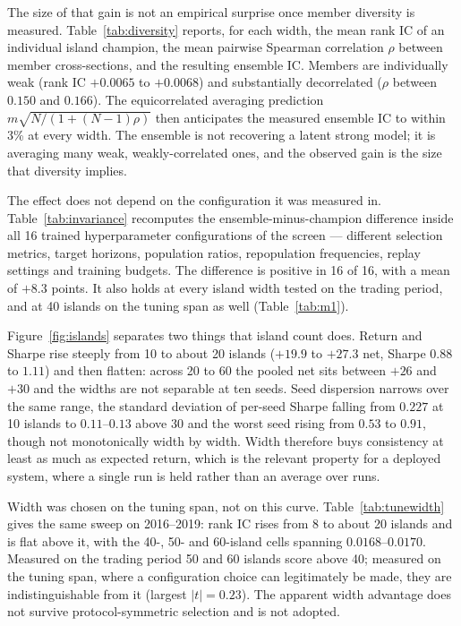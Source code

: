 
The size of that gain is not an empirical surprise once member diversity
is measured. Table~\ref{tab:diversity} reports, for each width, the mean
rank IC of an individual island champion, the mean pairwise Spearman
correlation $\rho$ between member cross-sections, and the resulting
ensemble IC. Members are individually weak (rank IC $+0.0065$ to
$+0.0068$) and substantially decorrelated ($\rho$ between $0.150$ and
$0.166$). The equicorrelated averaging prediction
$m\sqrt{N/(1+(N-1)\rho)}$ then anticipates the measured ensemble IC to
within 3\% at every width. The ensemble is not recovering a latent
strong model; it is averaging many weak, weakly-correlated ones, and the
observed gain is the size that diversity implies.


The effect does not depend on the configuration it was measured in.
Table~\ref{tab:invariance} recomputes the ensemble-minus-champion
difference inside all 16 trained hyperparameter configurations of the
screen --- different selection metrics, target horizons, population
ratios, repopulation frequencies, replay settings and training budgets.
The difference is positive in 16 of 16, with a mean of $+8.3$ points.
It also holds at every island width tested on the trading period, and at
40 islands on the tuning span as well (Table~\ref{tab:m1}).


Figure~\ref{fig:islands} separates two things that island count does.
Return and Sharpe rise steeply from 10 to about 20 islands ($+19.9$ to
$+27.3$ net, Sharpe $0.88$ to $1.11$) and then flatten: across 20 to 60
the pooled net sits between $+26$ and $+30$ and the widths are not
separable at ten seeds. Seed dispersion narrows over the same range, the
standard deviation of per-seed Sharpe falling from $0.227$ at 10 islands
to $0.11$--$0.13$ above 30 and the worst seed rising from $0.53$ to
$0.91$, though not monotonically width by width. Width therefore buys
consistency at least as much as expected return, which is the relevant
property for a deployed system, where a single run is held rather than an
average over runs.

Width was chosen on the tuning span, not on this curve.
Table~\ref{tab:tunewidth} gives the same sweep on 2016--2019: rank IC
rises from 8 to about 20 islands and is flat above it, with the 40-, 50-
and 60-island cells spanning $0.0168$--$0.0170$. Measured on the trading
period 50 and 60 islands score above 40; measured on the tuning span,
where a configuration choice can legitimately be made, they are
indistinguishable from it (largest $|t|=0.23$). The apparent width
advantage does not survive protocol-symmetric selection and is not
adopted.

